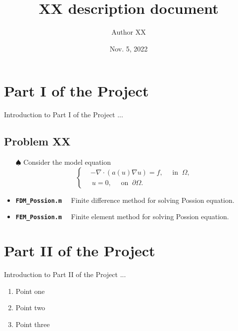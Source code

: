 \documentclass[11pt]{article}
\title{XX description document}
\author{Author XX}
\date{Nov. 5, 2022}
\numberwithin{equation}{section}
\newcommand{\textcode}[1]{\textcolor{winered}{\bfseries\texttt{#1}}~~}
\begin{document}
\maketitle



\section{Part I of the Project}

Introduction to Part I of the Project ...


\subsection{Problem XX}

\begin{itemize}

\item [$\spadesuit$] Consider the model equation
\begin{equation}\label{eq:NLPossion4}
\left\{
\begin{aligned}
&-\nabla \cdot(a(u) \nabla u) = f,\quad \text{ in } ~\Omega, \\
&~u = 0, \quad \text{ on } ~ \partial \Omega.
\end{aligned}\right.
\end{equation}

\item \textcode{FDM\_Possion.m} Finite difference method for solving Possion equation.

\item \textcode{FEM\_Possion.m} Finite element method for solving Possion equation.

\end{itemize}



\section{Part II of the Project}

Introduction to Part II of the Project ...

\begin{enumerate}
  \item Point one
  \item Point two
  \item Point three
\end{enumerate}
\end{document}
